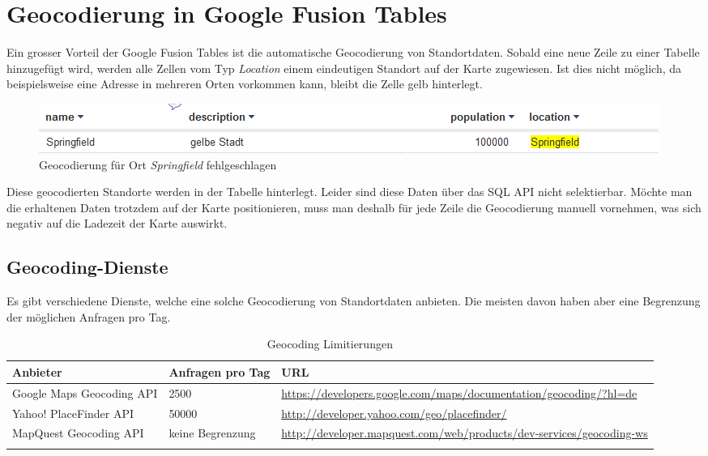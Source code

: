 \section{Geocodierung in Google Fusion Tables}
\label{gft-geocoding}
Ein grosser Vorteil der Google Fusion Tables ist die automatische 
\gls{Geocodierung} von Standortdaten. Sobald eine neue Zeile zu einer Tabelle hinzugefügt wird, werden alle Zellen vom Typ \emph{Location} einem eindeutigen Standort auf der Karte zugewiesen. Ist dies nicht möglich, da beispielsweise eine Adresse in mehreren Orten vorkommen kann, bleibt die Zelle gelb hinterlegt.

\begin{figure}[!ht]
	\centering
	\includegraphics[width=\textwidth]{images/einfuehrung/geocoding_failed}
	\caption{Geocodierung für Ort \emph{Springfield} fehlgeschlagen}
	\label{geocoding_failed}
\end{figure}

Diese geocodierten Standorte werden in der Tabelle hinterlegt. Leider sind diese Daten über das SQL \gls{API} nicht selektierbar. Möchte man die erhaltenen Daten trotzdem auf der Karte positionieren, muss man deshalb für jede Zeile die \gls{Geocodierung} manuell vornehmen, was sich negativ auf die Ladezeit der Karte auswirkt.

\subsection{Geocoding-Dienste}
Es gibt verschiedene Dienste, welche eine solche \gls{Geocodierung} von Standortdaten anbieten. Die meisten davon haben aber eine Begrenzung der möglichen Anfragen pro Tag.

\begin{longtable}{|p{0.4\threecelltabwidth}|p{0.14\threecelltabwidth}|p{0.46\threecelltabwidth}|}
\hline 
\textbf{Anbieter} & \textbf{Anfragen pro Tag} & \textbf{URL} \\ 
\hline 
Google Maps Geocoding \gls{API} & 2500 & \url{https://developers.google.com/maps/documentation/geocoding/?hl=de} \\ 
\hline 
Yahoo! PlaceFinder \gls{API} & 50000 & \url{http://developer.yahoo.com/geo/placefinder/} \\ 
\hline 
MapQuest Geocoding \gls{API} & keine Begrenzung & \url{http://developer.mapquest.com/web/products/dev-services/geocoding-ws} \\ 
\hline 
\caption{Geocoding Limitierungen}
\end{longtable} 


